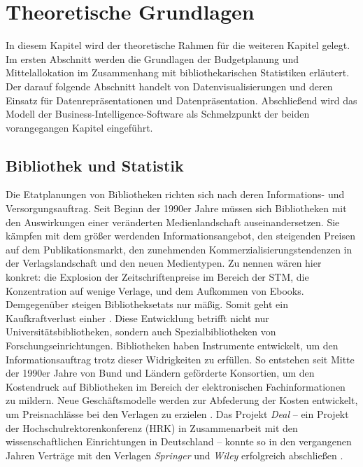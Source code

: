\chapter{Theoretische Grundlagen}
\label{chap:two}
In diesem Kapitel wird der theoretische Rahmen für die weiteren Kapitel gelegt. Im
ersten Abschnitt werden die Grundlagen der Budgetplanung und Mittelallokation im Zusammenhang mit bibliothekarischen Statistiken erläutert. 
Der darauf folgende Abschnitt handelt von Datenvisualisierungen und deren Einsatz
für Datenrepräsentationen und Datenpräsentation. Abschließend wird das Modell der Business-Intelligence-Software als Schmelzpunkt der 
beiden vorangegangen Kapitel eingeführt.

\section{Bibliothek und Statistik}
\label{chap:two_one}
Die Etatplanungen von Bibliotheken richten sich nach deren Informations- und Versorgungsauftrag. 
Seit Beginn der 1990er Jahre müssen sich Bibliotheken mit den Auswirkungen einer veränderten Medienlandschaft auseinandersetzen.
Sie kämpfen mit dem größer werdenden Informationsangebot, den steigenden Preisen auf dem Publikationsmarkt, 
den zunehmenden Kommerzialisierungstendenzen in der Verlagslandschaft und den neuen Medientypen. 
Zu nennen wären hier konkret: die Explosion der Zeitschriftenpreise im Bereich der \acrfull{STM}, die Konzentration auf wenige Verlage, 
und dem Aufkommen von Ebooks. Demgegenüber steigen Bibliotheksetats nur mäßig. 
Somit geht ein Kaufkraftverlust einher \cite[vgl.][164 ff.]{moravetz-kuhlmann_monika_erwerbungspolitik_2015}.
Diese Entwicklung betrifft nicht nur Universitätsbibliotheken, sondern auch Spezialbibliotheken von Forschungseinrichtungen.
Bibliotheken haben Instrumente entwickelt, um den Informationsauftrag trotz dieser Widrigkeiten zu erfüllen.
So entstehen seit Mitte der 1990er Jahre von Bund und Ländern geförderte Konsortien, um den Kostendruck auf Bibliotheken im Bereich der elektronischen
Fachinformationen zu mildern. Neue Geschäftsmodelle werden zur Abfederung der Kosten entwickelt, um Preisnachlässe bei den Verlagen zu erzielen
\cite[vgl.][169 ff.]{moravetz-kuhlmann_monika_erwerbungspolitik_2015}. Das Projekt \textit{Deal} -- ein Projekt der Hochschulrektorenkonferenz (HRK) in Zusammenarbeit mit den
wissenschaftlichen Einrichtungen in Deutschland -- konnte so in den vergangenen Jahren Verträge mit den Verlagen \textit{Springer} und \textit{Wiley} erfolgreich abschließen \cite[vgl.][]{projekt_deal_projekt_2020}.

